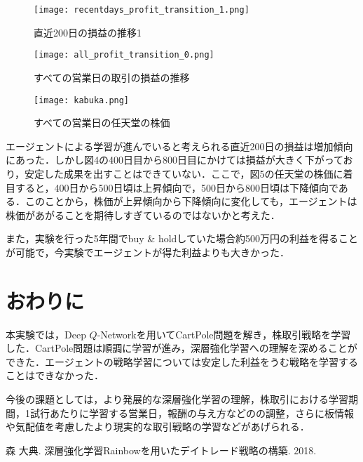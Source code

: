 \documentclass[twocolumn]{jarticle}
\begin{document}
        \begin{figure}
            \texttt{[image: recentdays\_profit\_transition\_1.png]}
            \caption{直近200日の損益の推移1}
        \end{figure}

        \begin{figure}
            \texttt{[image: all\_profit\_transition\_0.png]}
            \caption{すべての営業日の取引の損益の推移}
        \end{figure}

        \begin{figure}
            \texttt{[image: kabuka.png]}
            \caption{すべての営業日の任天堂の株価}
        \end{figure}

        エージェントによる学習が進んでいると考えられる直近200日の損益は増加傾向にあった．しかし図4の400日目から800日目にかけては損益が大きく下がっており，安定した成果を出すことはできていない．ここで，図5の任天堂の株価に着目すると，400日から500日頃は上昇傾向で，500日から800日頃は下降傾向である．このことから，株価が上昇傾向から下降傾向に変化しても，エージェントは株価があがることを期待しすぎているのではないかと考えた．

        また，実験を行った5年間でbuy \& holdしていた場合約500万円の利益を得ることが可能で，今実験でエージェントが得た利益よりも大きかった．
        
\section{おわりに}
本実験では，Deep $Q$-Networkを用いてCartPole問題を解き，株取引戦略を学習した．CartPole問題は順調に学習が進み，深層強化学習への理解を深めることができた．エージェントの戦略学習については安定した利益をうむ戦略を学習することはできなかった．

今後の課題としては，より発展的な深層強化学習の理解，株取引における学習期間，1試行あたりに学習する営業日，報酬の与え方などのの調整，さらに板情報や気配値を考慮したより現実的な取引戦略の学習などがあげられる．

\begin{thebibliography}{9}
     森 大典. 深層強化学習Rainbowを用いたデイトレード戦略の構築. 2018.
\end{thebibliography}
\end{document}
